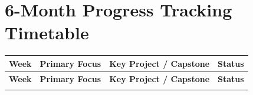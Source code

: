 \documentclass[11pt, a4paper]{article}
\begin{document}
\newpage
\section{6-Month Progress Tracking Timetable}

\begin{center}
\renewcommand{\arraystretch}{1.5}
\begin{longtable}{@{} c l p{7cm} c @{}}
\toprule
\textbf{Week} & \textbf{Primary Focus} & \textbf{Key Project / Capstone} & \textbf{Status} \\ 
\midrule
\endfirsthead

\toprule
\textbf{Week} & \textbf{Primary Focus} & \textbf{Key Project / Capstone} & \textbf{Status} \\ 
\midrule
\endhead

\bottomrule
\endfoot

\bottomrule
\endlastfoot


\end{longtable}
\end{center}
\end{document}
